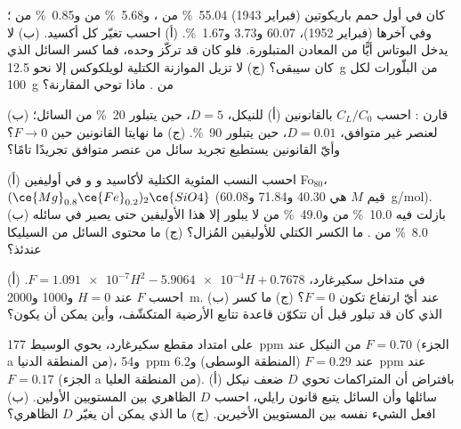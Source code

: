 \begin{exercise}[$\star$]\label{exo:b2:magmatic-differentiation:4}
كان في أول حمم باريكوتين (فبراير 1943) \qty{55.04}{\percent} من ،
و\qty{5.68}{\percent} من  و\qty{0.85}{\percent} من ؛ وفي آخرها (فبراير
1952)، 60.07 و3.73 و\qty{1.67}{\percent}. (أ) احسب تغيّر كل أكسيد.
(ب) لا يدخل البوتاس أيًّا من المعادن المتبلورة. فلو كان قد تركّز
 وحده، فما كسر السائل الذي كان سيبقى؟
(ج) لا تزيل الموازنة الكتلية لويلكوكس إلا نحو \qty{12.5}{g} من البلّورات لكل
\qty{100}{g} من . ماذا توحي المقارنة؟
\end{exercise}

\begin{exercise}[$\star\star$]\label{exo:b2:magmatic-differentiation:5}
قارن  : احسب $C_L/C_0$ بالقانونين
(أ) للنيكل، $D = 5$، حين يتبلور \qty{20}{\percent} من السائل؛ (ب)
لعنصر غير متوافق، $D = 0.01$، حين يتبلور \qty{90}{\percent}.
(ج) ما نهايتا القانونين حين $F \to 0$؟ وأيّ القانونين يستطيع تجريد سائل من
عنصر متوافق تجريدًا تامًا؟
\end{exercise}

\begin{exercise}[$\star\star$]\label{exo:b2:magmatic-differentiation:6}
(أ) احسب النسب المئوية الكتلية لأكاسيد  و و في أوليفين
Fo$_{80}$، $(\ce{Mg}_{0.8}\ce{Fe}_{0.2})_2\ce{SiO4}$ (قيم $M$ هي 40.30 و71.84
و\qty{60.08}{g/mol}). (ب) بازلت فيه \qty{10.0}{\percent} من 
و\qty{49.0}{\percent} من  لا يبلور إلا هذا الأوليفين حتى يصير في سائله
\qty{8.0}{\percent} من . ما الكسر الكتلي للأوليفين المُزال؟ (ج) ما
محتوى السائل من السيليكا عندئذ؟
\end{exercise}

\begin{exercise}[$\star\star$]\label{exo:b2:magmatic-differentiation:7}
في متداخل سكيرغارد، $F = \num{1.091e-7}H^2 - \num{5.9064e-4}H + 0.7678$.
(أ) احسب $F$ عند $H = 0$ و1000 و\qty{2000}{m}. (ب) عند أيّ ارتفاع تكون $F = 0$؟
(ج) ما كسر  الذي كان قد تبلور قبل أن تتكوّن قاعدة تتابع الأرضية
المتكشّف، وأين يمكن أن يكون؟
\end{exercise}

\begin{exercise}[$\star\star$]\label{exo:b2:magmatic-differentiation:8}
على امتداد مقطع سكيرغارد، يحوي  الوسيط \qty{177}{ppm} من النيكل عند
$F = 0.70$ (الجزء a من المنطقة الدنيا)، و\qty{54}{ppm} عند $F = 0.29$ (المنطقة الوسطى)
و\qty{6.2}{ppm} عند $F = 0.17$ (الجزء a من المنطقة العليا). (أ) بافتراض أن المتراكمات تحوي
$D$ ضعف نيكل سائلها وأن السائل يتبع قانون رايلي،
احسب $D$ الظاهري بين المستويين الأولين. (ب) افعل الشيء نفسه بين
المستويين الأخيرين. (ج) ما الذي يمكن أن يغيّر $D$ الظاهري؟
\end{exercise}

